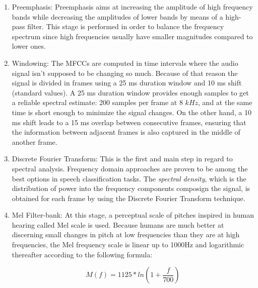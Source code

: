 \begin{enumerate}

  \item Preemphasis: Preemphasis aims at increasing the amplitude of high frequency bands while
  decreasing the amplitudes of lower bands by means of a high-pass filter. This stage is performed
  in order to balance the frequency spectrum since high frequencies usually have smaller
  magnitudes compared to lower ones.

  \item Windowing: The MFCCs are computed in time intervals where the audio signal isn't
  supposed to be changing
  so much. Because of that reason the signal is divided in frames using a
  25 ms duration window and 10 ms shift (standard values). A 25 ms duration window provides
  enough samples to get a reliable spectral estimate: 200 samples per frame at 8 $kHz$,
  and at the same time is short enough to minimize the signal changes.
  On the other hand, a 10 ms shift leads to a
  15 ms overlap between consecutive frames, ensuring that the information between adjacent
  frames is also captured in the middle of another frame.

  \item Discrete Fourier Transform: This is the first and main step in regard to spectral
  analysis. Frequency domain approaches are proven to be
  among the best options in speech classification tasks.
  The \textit{spectral density}, which is the distribution of power
  into the frequency components composign the signal, is obtained for each frame by using
  the Discrete Fourier Transform technique.   %

  \item Mel Filter-bank: At this stage, a perceptual scale of pitches inspired in human
  hearing called Mel scale is used. Because humans are much better at discerning small changes
  in pitch at low frequencies than they are at high frequencies,
  the Mel frequency scale is linear up to 1000Hz and logarithmic thereafter according to
  the following formula:

  \begin{equation}
    M(f)=1125*ln(1 + \frac{f}{700})
  \end{equation}


\end{enumerate}
